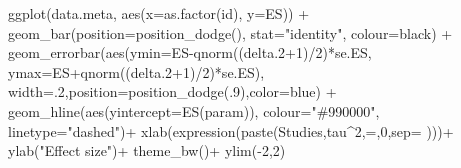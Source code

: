 \documentclass[
]{book}
\newenvironment{Shaded}{\begin{snugshade}}{\end{snugshade}}
\newcommand{\AttributeTok}[1]{\textcolor[rgb]{0.77,0.63,0.00}{#1}}
\newcommand{\DecValTok}[1]{\textcolor[rgb]{0.00,0.00,0.81}{#1}}
\newcommand{\FloatTok}[1]{\textcolor[rgb]{0.00,0.00,0.81}{#1}}
\newcommand{\FunctionTok}[1]{\textcolor[rgb]{0.00,0.00,0.00}{#1}}
\newcommand{\NormalTok}[1]{#1}
\newcommand{\SpecialCharTok}[1]{\textcolor[rgb]{0.00,0.00,0.00}{#1}}
\newcommand{\StringTok}[1]{\textcolor[rgb]{0.31,0.60,0.02}{#1}}
\theoremstyle{definition}
\theoremstyle{definition}
\theoremstyle{definition}
\theoremstyle{definition}
\theoremstyle{remark}
\begin{document}
\begin{Shaded}
\begin{Highlighting}[]
  \FunctionTok{ggplot}\NormalTok{(data.meta, }\FunctionTok{aes}\NormalTok{(}\AttributeTok{x=}\FunctionTok{as.factor}\NormalTok{(id), }\AttributeTok{y=}\NormalTok{ES)) }\SpecialCharTok{+}
      \FunctionTok{geom\_bar}\NormalTok{(}\AttributeTok{position=}\FunctionTok{position\_dodge}\NormalTok{(), }\AttributeTok{stat=}\StringTok{"identity"}\NormalTok{, }\AttributeTok{colour=}\StringTok{\textquotesingle{}black\textquotesingle{}}\NormalTok{) }\SpecialCharTok{+}
      \FunctionTok{geom\_errorbar}\NormalTok{(}\FunctionTok{aes}\NormalTok{(}\AttributeTok{ymin=}\NormalTok{ES}\SpecialCharTok{{-}}\FunctionTok{qnorm}\NormalTok{((delta}\FloatTok{.2}\SpecialCharTok{+}\DecValTok{1}\NormalTok{)}\SpecialCharTok{/}\DecValTok{2}\NormalTok{)}\SpecialCharTok{*}\NormalTok{se.ES, }\AttributeTok{ymax=}\NormalTok{ES}\SpecialCharTok{+}\FunctionTok{qnorm}\NormalTok{((delta}\FloatTok{.2}\SpecialCharTok{+}\DecValTok{1}\NormalTok{)}\SpecialCharTok{/}\DecValTok{2}\NormalTok{)}\SpecialCharTok{*}\NormalTok{se.ES), }\AttributeTok{width=}\NormalTok{.}\DecValTok{2}\NormalTok{,}\AttributeTok{position=}\FunctionTok{position\_dodge}\NormalTok{(.}\DecValTok{9}\NormalTok{),}\AttributeTok{color=}\StringTok{\textquotesingle{}blue\textquotesingle{}}\NormalTok{) }\SpecialCharTok{+}
      \FunctionTok{geom\_hline}\NormalTok{(}\FunctionTok{aes}\NormalTok{(}\AttributeTok{yintercept=}\FunctionTok{ES}\NormalTok{(param)), }\AttributeTok{colour=}\StringTok{"\#990000"}\NormalTok{, }\AttributeTok{linetype=}\StringTok{"dashed"}\NormalTok{)}\SpecialCharTok{+}
      \FunctionTok{xlab}\NormalTok{(}\FunctionTok{expression}\NormalTok{(}\FunctionTok{paste}\NormalTok{(}\StringTok{\textquotesingle{}Studies\textquotesingle{}}\NormalTok{,tau}\SpecialCharTok{\^{}}\DecValTok{2}\NormalTok{,}\StringTok{\textquotesingle{}=\textquotesingle{}}\NormalTok{,}\DecValTok{0}\NormalTok{,}\AttributeTok{sep=}\StringTok{\textquotesingle{} \textquotesingle{}}\NormalTok{)))}\SpecialCharTok{+}
      \FunctionTok{ylab}\NormalTok{(}\StringTok{"Effect size"}\NormalTok{)}\SpecialCharTok{+}
      \FunctionTok{theme\_bw}\NormalTok{()}\SpecialCharTok{+}
      \FunctionTok{ylim}\NormalTok{(}\SpecialCharTok{{-}}\DecValTok{2}\NormalTok{,}\DecValTok{2}\NormalTok{)}


\end{Highlighting}
\end{Shaded}
\end{document}
